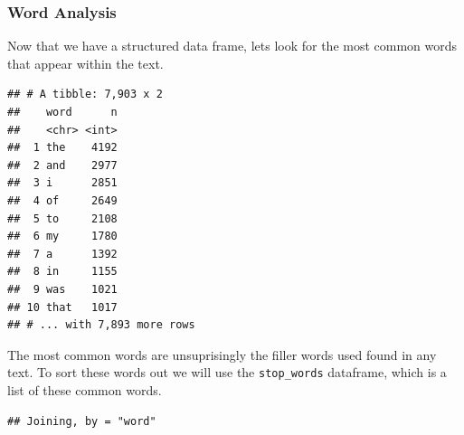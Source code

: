 \documentclass[]{article}
\newenvironment{Shaded}{\begin{snugshade}}{\end{snugshade}}
\newcommand{\DataTypeTok}[1]{\textcolor[rgb]{0.13,0.29,0.53}{#1}}
\newcommand{\KeywordTok}[1]{\textcolor[rgb]{0.13,0.29,0.53}{\textbf{#1}}}
\newcommand{\NormalTok}[1]{#1}
\newcommand{\OperatorTok}[1]{\textcolor[rgb]{0.81,0.36,0.00}{\textbf{#1}}}
\newcommand{\StringTok}[1]{\textcolor[rgb]{0.31,0.60,0.02}{#1}}
\begin{document}
\hypertarget{word-analysis}{%
\subsubsection{Word Analysis}\label{word-analysis}}

Now that we have a structured data frame, lets look for the most common
words that appear within the text.

\begin{Shaded}
\end{Shaded}

\begin{verbatim}
## # A tibble: 7,903 x 2
##    word      n
##    <chr> <int>
##  1 the    4192
##  2 and    2977
##  3 i      2851
##  4 of     2649
##  5 to     2108
##  6 my     1780
##  7 a      1392
##  8 in     1155
##  9 was    1021
## 10 that   1017
## # ... with 7,893 more rows
\end{verbatim}

The most common words are unsuprisingly the filler words used found in
any text. To sort these words out we will use the \texttt{stop\_words}
dataframe, which is a list of these common words.

\begin{Shaded}
\end{Shaded}

\begin{verbatim}
## Joining, by = "word"
\end{verbatim}

\begin{Shaded}
\end{Shaded}
\end{document}

